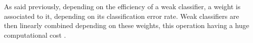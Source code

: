 \noindent As said previously, depending on the efficiency of a weak classifier, a weight is associated to it, depending on its classification error rate. Weak classifiers are then linearly combined depending on these weights, this operation having a huge computational cost \cite{DIN08}.
\newline





